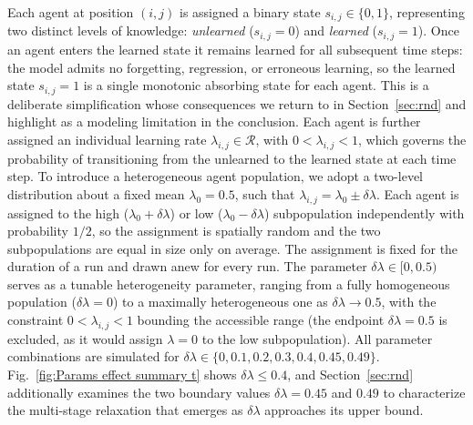 \documentclass[a4paper,fleqn]{cas-sc}
\begin{document}
Each agent at position $(i,j)$ is assigned a binary state $s_{i,j}\in\{0,1\}$, representing two distinct levels of knowledge: \textit{unlearned} ($s_{i,j}=0$) and \textit{learned} ($s_{i,j}=1$).
Once an agent enters the learned state it remains learned for all subsequent time steps: the model admits no forgetting, regression, or erroneous learning, so the learned state $s_{i,j}=1$ is a single monotonic absorbing state for each agent. This is a deliberate simplification whose consequences we return to in Section~\ref{sec:rnd} and highlight as a modeling limitation in the conclusion.
Each agent is further assigned an individual learning rate $\lambda_{i,j}\in\mathcal{R}$, with $0<\lambda_{i,j}<1$, which governs the probability of transitioning from the unlearned to the learned state at each time step.
To introduce a heterogeneous agent population, we adopt a two-level distribution about a fixed mean $\lambda_0=0.5$, such that $\lambda_{i,j}=\lambda_0\pm\delta\lambda$.
Each agent is assigned to the high ($\lambda_0+\delta\lambda$) or low ($\lambda_0-\delta\lambda$) subpopulation independently with probability $1/2$, so the assignment is spatially random and the two subpopulations are equal in size only on average. The assignment is fixed for the duration of a run and drawn anew for every run.
The parameter $\delta\lambda\in[0,0.5)$ serves as a tunable heterogeneity parameter, ranging from a fully homogeneous population ($\delta\lambda=0$) to a maximally heterogeneous one as $\delta\lambda\to0.5$, with the constraint $0<\lambda_{i,j}<1$ bounding the accessible range (the endpoint $\delta\lambda=0.5$ is excluded, as it would assign $\lambda=0$ to the low subpopulation).
All parameter combinations are simulated for $\delta\lambda\in\{0,0.1,0.2,0.3,0.4,0.45,0.49\}$. Fig.~\ref{fig:Params effect summary t} shows $\delta\lambda\le0.4$, and Section~\ref{sec:rnd} additionally examines the two boundary values $\delta\lambda=0.45$ and $0.49$ to characterize the multi-stage relaxation that emerges as $\delta\lambda$ approaches its upper bound.
\end{document}
